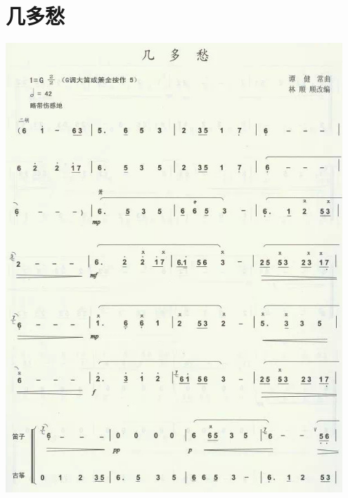 \documentclass[cn,pad,twocol]{elegantbook}
\begin{document}
\section{几多愁}\includegraphics[width=0.95\textwidth]{dongxiao/20200819/几多愁.jpeg}
\end{document}
